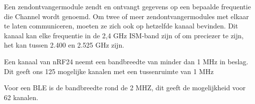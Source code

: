 Een zendontvangermodule zendt en ontvangt gegevens op een bepaalde frequentie die Channel wordt genoemd. Om twee of meer zendontvangermodules met elkaar te laten communiceren, moeten ze zich ook op hetzelfde kanaal bevinden. Dit kanaal kan elke frequentie in de 2,4 GHz ISM-band zijn of om preciezer te zijn, het kan tussen 2.400 en 2.525 GHz zijn.

Een kanaal van nRF24 neemt een bandbreedte van minder dan 1 MHz in beslag. Dit geeft ons 125 mogelijke kanalen met een tussenruimte van 1 MHz

Voor een BLE is de bandbreedte rond de 2 MHZ, dit geeft de mogelijkheid voor 62 kanalen.



